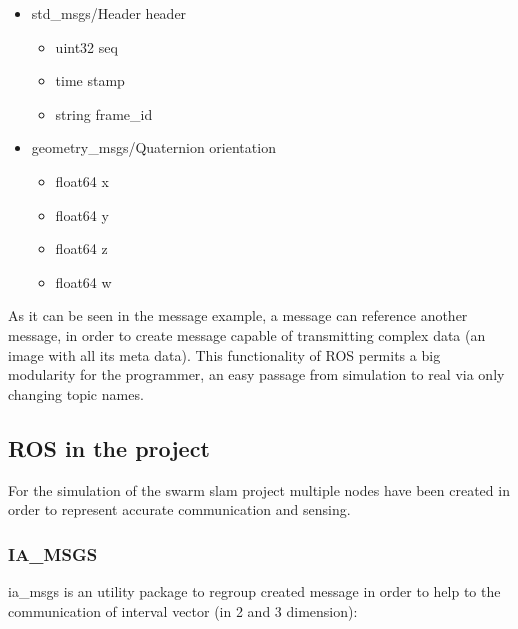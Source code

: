 \begin{minipage}[b]{0.8\textwidth}
\begin{itemize}[label={},itemsep=0cm,topsep=0cm]
\item std\_msgs/Header header
  \begin{itemize}[label={},itemsep=0cm,topsep=0cm]
  \item uint32 seq
  \item time stamp
  \item string frame\_id
   \end{itemize}
\item geometry\_msgs/Quaternion orientation
  \begin{itemize}[label={},itemsep=0cm,topsep=0cm]
  \item float64 x
  \item float64 y
  \item float64 z
  \item float64 w
  \end{itemize}
\end{itemize}
\end{minipage}


As it can be seen in the message example, a message can reference another message, in order to create message capable of transmitting complex data (an image with all its meta data).
This functionality of ROS permits a big modularity for the programmer, an easy passage from simulation to real via only changing topic names.

\subsection{ROS in the project}

For the simulation of the swarm slam project multiple nodes have been 
created in order to represent accurate communication and sensing.

\subsubsection*{IA\_MSGS}

ia\_msgs is an utility package to regroup created message in order to help to the communication of interval vector (in 2 and 3 dimension):\\

